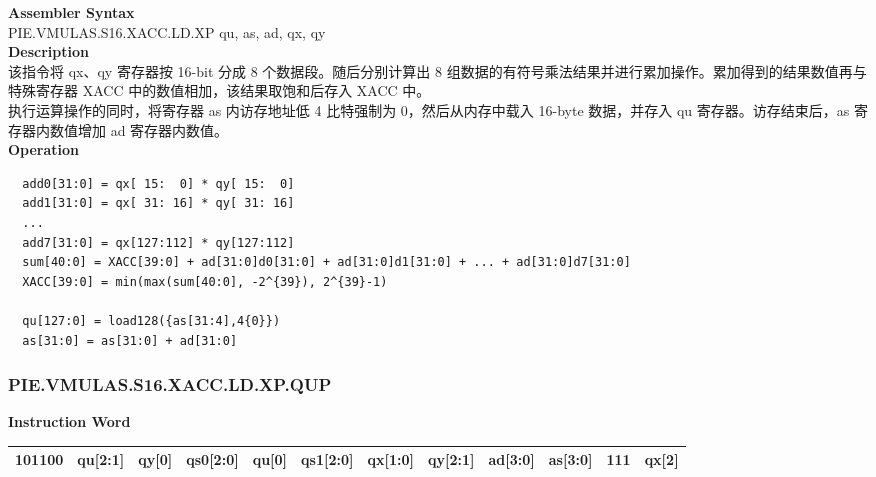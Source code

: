 \textbf{Assembler Syntax} \\
PIE.VMULAS.S16.XACC.LD.XP qu, as, ad, qx, qy \\
\textbf{Description} \\
该指令将 qx、qy 寄存器按 16-bit 分成 8 个数据段。随后分别计算出 8 组数据的有符号乘法结果并进行累加操作。累加得到的结果数值再与特殊寄存器 XACC 中的数值相加，该结果取饱和后存入 XACC 中。\\
执行运算操作的同时，将寄存器 as 内访存地址低 4 比特强制为 0，然后从内存中载入 16-byte 数据，并存入 qu 寄存器。访存结束后，as 寄存器内数值增加 ad 寄存器内数值。\\
\textbf{Operation}
\begin{lstlisting}
  add0[31:0] = qx[ 15:  0] * qy[ 15:  0]
  add1[31:0] = qx[ 31: 16] * qy[ 31: 16]
  ...
  add7[31:0] = qx[127:112] * qy[127:112]
  sum[40:0] = XACC[39:0] + ad[31:0]d0[31:0] + ad[31:0]d1[31:0] + ... + ad[31:0]d7[31:0]
  XACC[39:0] = min(max(sum[40:0], -2^{39}), 2^{39}-1)

  qu[127:0] = load128({as[31:4],4{0}})
  as[31:0] = as[31:0] + ad[31:0]
\end{lstlisting}

\newpage
\subsubsection{PIE.VMULAS.S16.XACC.LD.XP.QUP}\label{instruction:PIEVMULASS16XACCLDXPQUP}
\setlength\tabcolsep{6pt}
\textbf{Instruction Word} \\
\begin{tabular}{|c|c|c|c|c|c|c|c|c|c|c|c|}
	\hline
	101100 & qu[2:1] & qy[0] & qs0[2:0] & qu[0] & qs1[2:0] & qx[1:0] & qy[2:1] & ad[3:0] & as[3:0] & 111 & qx[2] \\
	\hline
\end{tabular}

